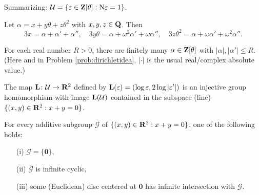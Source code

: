 Summarizing: $\mathcal{U}= \{\varepsilon\in \mathbf{Z}[\theta]: \mathrm{N}\varepsilon=1\}$.  

\begin{prob}\label{prob:coeffsisolate} Let $\alpha = x+y\theta+z\theta^2$ with $x,y,z \in \mathbf{Q}$. Then 
\[ 3x = \alpha + \alpha' + \alpha'', \quad 3y \theta = \alpha + \omega^2\alpha' + \omega \alpha'', \quad 3z \theta^2 = \alpha + \omega\alpha' + \omega^2\alpha''. \]
\end{prob}

\begin{prob}\label{prob:discretelattice}For each real number $R > 0$, there are finitely many $\alpha \in \mathbf{Z}[\theta]$ with $|\alpha|, |\alpha'|\le R$. (Here and in Problem \ref{prob:dirichletidea}, $|\cdot|$ is the usual real/complex absolute value.)
\end{prob}

\begin{prob}\label{prob:dirichletidea} The map $\mathbf{L}\colon \mathcal{U}\to \mathbf{R}^2$ defined by $\mathbf{L}(\varepsilon) = (\log{\varepsilon},2 \log{|\varepsilon'|})$ is an injective group homomorphism with image $\mathbf{L}(\mathcal{U})$ contained in the subspace (line) $\{(x,y)\in \mathbf{R}^2: x+y=0\}$.
\end{prob}


\begin{prob}\label{prob:grouplemma} For every additive subgroup $\mathcal{G}$ of $\{(x,y)\in \mathbf{R}^2: x+y=0\}$, one of the following holds:
\begin{enumerate}
\item[(i)] $\mathcal{G} = \{\mathbf{0}\}$,
\item[(ii)] $\mathcal{G}$ is infinite cyclic,
\item[(iii)] some (Euclidean) disc centered at $\mathbf{0}$ has infinite intersection with $\mathcal{G}$.
\end{enumerate}
\end{prob}


